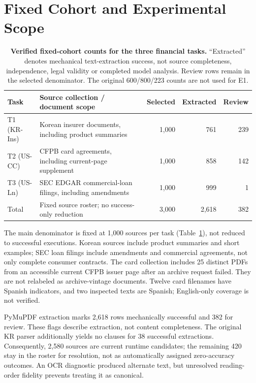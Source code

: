 \documentclass[11pt]{article}
\begin{document}
\section{Fixed Cohort and Experimental Scope}
\label{sec:corpus-stats}
\begin{table}[t]
\centering\small\setlength{\tabcolsep}{5pt}


\begin{tabularx}{\textwidth}{lXrrr}
\toprule
Task & Source collection / document scope & Selected & Extracted & Review \\
\midrule
T1 (KR-Ins) & Korean insurer documents, including product summaries & 1,000 & 761 & 239 \\
T2 (US-CC)  & CFPB card agreements, including current-page supplement & 1,000 & 858 & 142 \\
T3 (US-Ln)  & SEC EDGAR commercial-loan filings, including amendments & 1,000 & 999 & 1 \\
\midrule
Total & Fixed source roster; no success-only reduction & 3,000 & 2,618 & 382 \\
\bottomrule
\end{tabularx}
\caption{\textbf{Verified fixed-cohort counts for the three financial tasks.}
``Extracted'' denotes mechanical text-extraction success, not source completeness,
independence, legal validity or completed model analysis. Review rows remain in
the selected denominator. The original 600/800/223 counts are not used for E1.}
\label{tab:corpus}
\end{table}

The main denominator is fixed at 1,000 sources per task
(Table~\ref{tab:corpus}), not reduced to successful executions. Korean
sources include product summaries and short examples; SEC loan filings
include amendments and commercial agreements, not only complete consumer
contracts. The card collection includes 25 distinct PDFs from an accessible
current CFPB issuer page after an archive request failed. They are not
relabeled as archive-vintage documents. Twelve card filenames have Spanish
indicators, and two inspected texts are Spanish; English-only coverage is
not verified.

PyMuPDF extraction marks 2,618 rows mechanically successful and 382 for
review. These flags describe extraction, not content completeness.
The original KR parser additionally yields no clauses for 38 successful
extractions. Consequently, 2,580 sources are current runtime candidates;
the remaining 420 stay in the roster for resolution, not as automatically
assigned zero-accuracy outcomes. An OCR diagnostic produced alternate text,
but unresolved reading-order fidelity prevents treating it as canonical.
\end{document}
